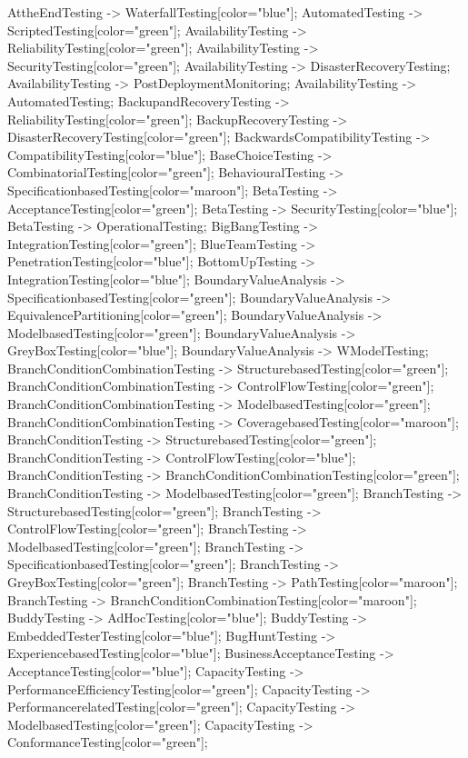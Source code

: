 \documentclass{article}
\begin{document}
{AttheEndTesting -> WaterfallTesting[color="blue"];
AutomatedTesting -> ScriptedTesting[color="green"];
AvailabilityTesting -> ReliabilityTesting[color="green"];
AvailabilityTesting -> SecurityTesting[color="green"];
AvailabilityTesting -> DisasterRecoveryTesting;
AvailabilityTesting -> PostDeploymentMonitoring;
AvailabilityTesting -> AutomatedTesting;
BackupandRecoveryTesting -> ReliabilityTesting[color="green"];
BackupRecoveryTesting -> DisasterRecoveryTesting[color="green"];
BackwardsCompatibilityTesting -> CompatibilityTesting[color="blue"];
BaseChoiceTesting -> CombinatorialTesting[color="green"];
BehaviouralTesting -> SpecificationbasedTesting[color="maroon"];
BetaTesting -> AcceptanceTesting[color="green"];
BetaTesting -> SecurityTesting[color="blue"];
BetaTesting -> OperationalTesting;
BigBangTesting -> IntegrationTesting[color="green"];
BlueTeamTesting -> PenetrationTesting[color="blue"];
BottomUpTesting -> IntegrationTesting[color="blue"];
BoundaryValueAnalysis -> SpecificationbasedTesting[color="green"];
BoundaryValueAnalysis -> EquivalencePartitioning[color="green"];
BoundaryValueAnalysis -> ModelbasedTesting[color="green"];
BoundaryValueAnalysis -> GreyBoxTesting[color="blue"];
BoundaryValueAnalysis -> WModelTesting;
BranchConditionCombinationTesting -> StructurebasedTesting[color="green"];
BranchConditionCombinationTesting -> ControlFlowTesting[color="green"];
BranchConditionCombinationTesting -> ModelbasedTesting[color="green"];
BranchConditionCombinationTesting -> CoveragebasedTesting[color="maroon"];
BranchConditionTesting -> StructurebasedTesting[color="green"];
BranchConditionTesting -> ControlFlowTesting[color="blue"];
BranchConditionTesting -> BranchConditionCombinationTesting[color="green"];
BranchConditionTesting -> ModelbasedTesting[color="green"];
BranchTesting -> StructurebasedTesting[color="green"];
BranchTesting -> ControlFlowTesting[color="green"];
BranchTesting -> ModelbasedTesting[color="green"];
BranchTesting -> SpecificationbasedTesting[color="green"];
BranchTesting -> GreyBoxTesting[color="green"];
BranchTesting -> PathTesting[color="maroon"];
BranchTesting -> BranchConditionCombinationTesting[color="maroon"];
BuddyTesting -> AdHocTesting[color="blue"];
BuddyTesting -> EmbeddedTesterTesting[color="blue"];
BugHuntTesting -> ExperiencebasedTesting[color="blue"];
BusinessAcceptanceTesting -> AcceptanceTesting[color="blue"];
CapacityTesting -> PerformanceEfficiencyTesting[color="green"];
CapacityTesting -> PerformancerelatedTesting[color="green"];
CapacityTesting -> ModelbasedTesting[color="green"];
CapacityTesting -> ConformanceTesting[color="green"];
}
\end{document}
